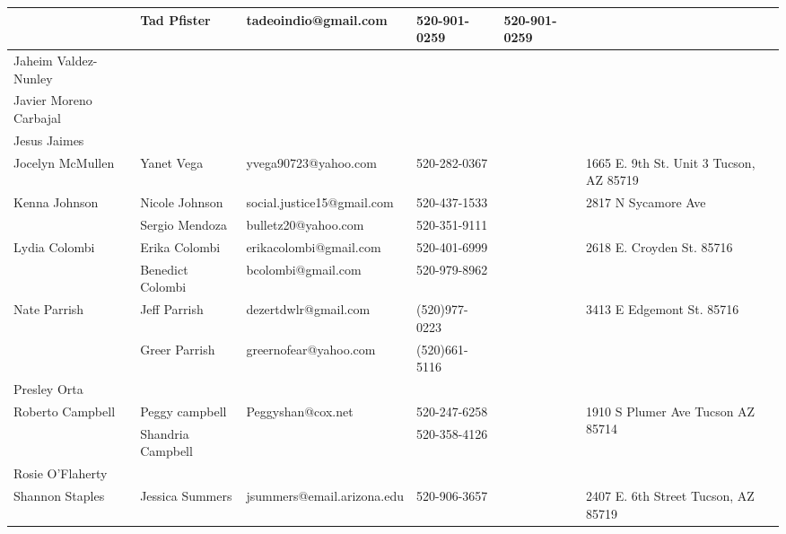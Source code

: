 \documentclass[landscape]{article}\usepackage[]{graphicx}\usepackage[]{color}
\begin{document}
\begin{longtable}{|p{100pt}|p{100pt}|p{140pt}|p{60pt}|p{64pt}|p{120pt}|}
 & Tad Pfister & tadeoindio@gmail.com & 520-901-0259 & 520-901-0259 & \\
\hline
\multirow{2}{100pt}{Jaheim Valdez-Nunley} &  &  &  &  & \multirow{2}{120pt}{} \\
 &  &  &  &  & \\
\hline
\multirow{2}{100pt}{Javier Moreno Carbajal} &  &  &  &  & \multirow{2}{120pt}{} \\
 &  &  &  &  & \\
\hline
\multirow{2}{100pt}{Jesus Jaimes} &  &  &  &  & \multirow{2}{120pt}{} \\
 &  &  &  &  & \\
\hline
\multirow{2}{100pt}{Jocelyn McMullen} & Yanet Vega & yvega90723@yahoo.com & 520-282-0367 &  & \multirow{2}{120pt}{1665 E. 9th St. Unit 3 Tucson, AZ 85719} \\
 &  &  &  &  & \\
\hline
\multirow{2}{100pt}{Kenna Johnson} & Nicole Johnson & social.justice15@gmail.com & 520-437-1533 &  & \multirow{2}{120pt}{2817 N Sycamore Ave} \\
 & Sergio Mendoza & bulletz20@yahoo.com & 520-351-9111 &  & \\
\hline
\multirow{2}{100pt}{Lydia Colombi} & Erika Colombi & erikacolombi@gmail.com & 520-401-6999 &  & \multirow{2}{120pt}{2618 E. Croyden St. 85716} \\
 & Benedict Colombi & bcolombi@gmail.com & 520-979-8962 &  & \\
\hline
\multirow{2}{100pt}{Nate Parrish} & Jeff Parrish & dezertdwlr@gmail.com & (520)977-0223 &  & \multirow{2}{120pt}{3413 E Edgemont St. 85716} \\
 & Greer Parrish & greernofear@yahoo.com & (520)661-5116 &  & \\
\hline
\multirow{2}{100pt}{Presley Orta} &  &  &  &  & \multirow{2}{120pt}{} \\
 &  &  &  &  & \\
\hline
\multirow{2}{100pt}{Roberto Campbell} & Peggy campbell & Peggyshan@cox.net & 520-247-6258 &  & \multirow{2}{120pt}{1910 S Plumer Ave Tucson AZ 85714} \\
 & Shandria Campbell  &  & 520-358-4126 &  & \\
\hline
\multirow{2}{100pt}{Rosie O'Flaherty} &  &  &  &  & \multirow{2}{120pt}{} \\
 &  &  &  &  & \\
\hline
\multirow{2}{100pt}{Shannon Staples} & Jessica Summers & jsummers@email.arizona.edu & 520-906-3657 &  & \multirow{2}{120pt}{2407 E. 6th Street Tucson, AZ  85719} \\

\end{longtable}
\end{document}

